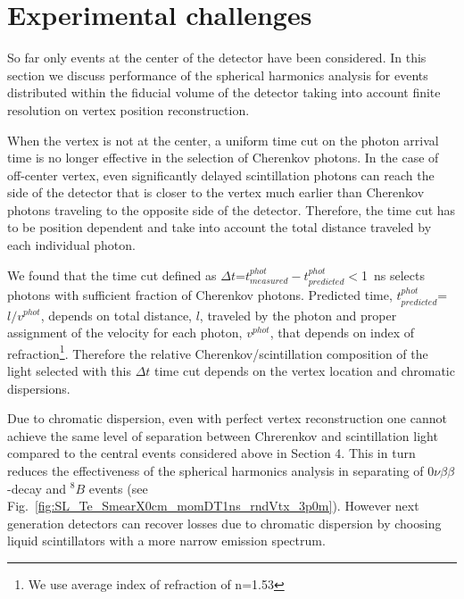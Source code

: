 \documentclass[12pt,twoside,letterpaper]{article}
\newcommand{\vbb}{0\nu\beta\beta}
\newcommand{\B}{^{8}B}
\begin{document}
\section{Experimental challenges}

So far only events at the center of the detector have been considered. In this section we discuss performance of the spherical harmonics analysis for events distributed within the fiducial volume of the detector taking into account finite resolution on vertex position reconstruction.

When the vertex is not at the center, a uniform time cut on the photon arrival time is no longer effective in the selection of Cherenkov photons. In the case of off-center vertex, even significantly delayed scintillation photons can reach the side of the detector that is closer to the vertex much earlier than Cherenkov photons traveling to the opposite side of the detector. Therefore, the time cut has to be position dependent and take into account the total distance traveled by each individual photon.

We found that the time cut defined as $\Delta t$=$t^{phot}_{measured} - t^{phot}_{predicted}$$<$1~ns selects photons with sufficient fraction of Cherenkov photons. Predicted time, $ t^{phot}_{predicted}$=$l/v^{phot}$, depends on total distance, $l$, traveled by the photon and proper assignment of the velocity for each photon, $v^{phot}$, that depends on index of refraction\footnote{We use average index of refraction of n=1.53}. Therefore the relative Cherenkov/scintillation composition of the light selected with this $\Delta t$ time cut depends on the vertex location and chromatic dispersions. 

Due to chromatic dispersion, even with perfect vertex reconstruction one cannot achieve the same level of separation between Chrerenkov and scintillation light compared to the central events considered above in Section 4. This in turn reduces the effectiveness of the spherical harmonics analysis in separating of $\vbb$-decay and $\B$ events (see Fig.~\ref{fig:SL_Te_SmearX0cm_momDT1ns_rndVtx_3p0m}). However next generation detectors can recover losses due to chromatic dispersion by choosing liquid scintillators with a more narrow emission spectrum.
\end{document}
